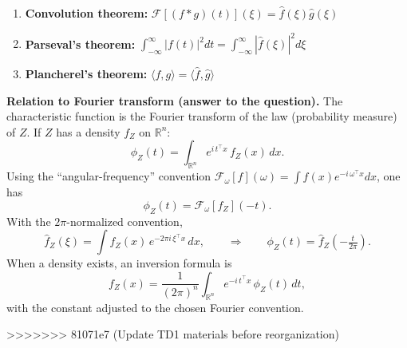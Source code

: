 \documentclass[a4paper, 12pt]{article}
\begin{document}
\begin{answerenum}
\begin{enumerate}
                \item \textbf{Convolution theorem:} $\mathcal{F}[(f * g)(t)](\xi) = \hat{f}(\xi) \hat{g}(\xi)$
                
                \item \textbf{Parseval's theorem:} $\int_{-\infty}^{\infty} |f(t)|^2 dt = \int_{-\infty}^{\infty} |\hat{f}(\xi)|^2 d\xi$
                
                \item \textbf{Plancherel's theorem:} $\langle f, g \rangle = \langle \hat{f}, \hat{g} \rangle$
            \end{enumerate}
            
            \textbf{Relation to Fourier transform (answer to the question).}
            The characteristic function is the Fourier transform of the law (probability measure) of $Z$. If $Z$ has a density $f_Z$ on $\mathbb{R}^n$:
            \[
              \phi_Z(t)=\int_{\mathbb{R}^n} e^{i\,t^\top x}\,f_Z(x)\,dx.
            \]
            Using the “angular-frequency” convention $\mathcal{F}_\omega[f](\omega)=\int f(x)e^{-i\,\omega^\top x}dx$, one has
            \[
              \phi_Z(t)=\mathcal{F}_\omega[f_Z](-t).
            \]
            With the $2\pi$-normalized convention,
            \[
              \hat f_Z(\xi)=\int f_Z(x)\,e^{-2\pi i\,\xi^\top x}\,dx,
              \qquad\Rightarrow\qquad
              \phi_Z(t)=\hat f_Z\!\left(-\tfrac{t}{2\pi}\right).
            \]
            When a density exists, an inversion formula is
            \[
              f_Z(x)=\frac{1}{(2\pi)^n}\int_{\mathbb{R}^n} e^{-i\,t^\top x}\,\phi_Z(t)\,dt,
            \]
            with the constant adjusted to the chosen Fourier convention.
    \end{answerenum}
>>>>>>> 81071e7 (Update TD1 materials before reorganization)
\end{document}
